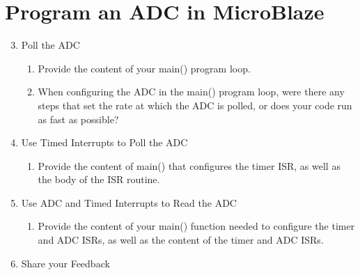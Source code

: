 \documentclass[10pt]{article}
\begin{document}
  \section*{Program an ADC in MicroBlaze}
    \begin{enumerate}
      \setcounter{enumi}{2}
      \item Poll the ADC 
      \begin{enumerate}
        \item Provide the content of your main() program loop.\\[1em]

        \item When configuring the ADC in the main() program loop, were there any steps that set the rate at which the ADC is polled, or does your code run as fast as possible?\\[1em]
      \end{enumerate}

      \item Use Timed Interrupts to Poll the ADC
        \begin{enumerate}
          \item Provide the content of main() that configures the timer ISR, as well as the body of the ISR routine.\\[1em]
        \end{enumerate}

      \item Use ADC and Timed Interrupts to Read the ADC
        \begin{enumerate}
          \item Provide the content of your main() function needed to configure the timer and ADC ISRs, as well as the content of the timer and ADC ISRs.\\[1em]
        \end{enumerate}

      \item Share your Feedback\\[1em]
    \end{enumerate}
  
\end{document}
